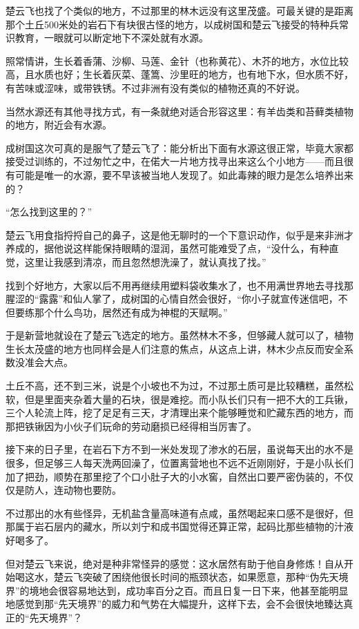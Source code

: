 楚云飞也找了个类似的地方，不过那里的林木远没有这里茂盛。可最关键的是距离那个土丘500米处的岩石下有块很古怪的地方，以成树国和楚云飞接受的特种兵常识教育，一眼就可以断定地下不深处就有水源。

照常情讲，生长着香蒲、沙柳、马莲、金针（也称黄花）、木芥的地方，水位比较高，且水质也好；生长着灰菜、蓬篙、沙里旺的地方，也有地下水，但水质不好，有苦味或涩味，或带铁锈。不过非洲有没有类似的植物还真的不好说。

当然水源还有其他寻找方式，有一条就绝对适合形容这里：有羊齿类和苔藓类植物的地方，附近会有水源。

成树国这次可真的是服气了楚云飞了：能分析出下面有水源这很正常，毕竟大家都接受过训练的，不过匆忙之中，在偌大一片地方找寻出来这么个小地方——而且很有可能是唯一的水源，要不早该被当地人发现了。如此毒辣的眼力是怎么培养出来的？

“怎么找到这里的？”

楚云飞用食指捋捋自己的鼻子，这是他无聊时的一个下意识动作，似乎是来非洲才养成的，据他说这样能保持眼睛的湿润，虽然可能难受了点，“没什么，有种直觉，这里让我感到清凉，而且忽然想洗澡了，就认真找了找。”

找到个好地方，大家以后不用再继续用塑料袋收集水了，也不用满世界地去寻找那腥涩的“露露”和仙人掌了，成树国的心情自然会很好，“你小子就宣传迷信吧，不但要练那个什么鸟功，居然还有成为神棍的天赋啊。”

于是新营地就设在了楚云飞选定的地方。虽然林木不多，但够藏人就可以了，植物生长太茂盛的地方也同样会是人们注意的焦点，从这点上讲，林木少点反而安全系数没准会大点。

土丘不高，还不到三米，说是个小坡也不为过，不过那土质可是比较糟糕，虽然松软，但是里面夹杂着大量的石块，很是难挖。而小队长们只有一把不大的工兵锹，三个人轮流上阵，挖了足足有三天，才清理出来个能够睡觉和贮藏东西的地方，而那把铁锹因为小伙子们玩命的劳动磨损已经得相当厉害了。

接下来的日子里，在岩石下方不到一米处发现了渗水的石层，虽说每天出的水不是很多，但足够三人每天洗两回澡了，位置离营地也不远不近刚刚好，于是小队长们加了把劲，顺势在那里挖了个口小肚子大的小水窖，自然出口要严密伪装的，不仅仅是防人，连动物也要防。

不过那出的水有些怪异，无机盐含量高味道有点咸，虽然喝起来口感不是很好，但那属于岩石层内的藏水，所以刘宁和成书国觉得还算正常，起码比那些植物的汁液好喝多了。

但对楚云飞来说，绝对是种非常怪异的感觉：这水居然有助于他自身修炼！自从开始喝这水，楚云飞突破了困绕他很长时间的瓶颈状态，如果愿意，那种“伪先天境界”的境地会很容易地达到，成功率百分之百。而且日复一日下来，他甚至能明显地感觉到那“先天境界”的威力和气势在大幅提升，这样下去，会不会很快地臻达真正的“先天境界”？

